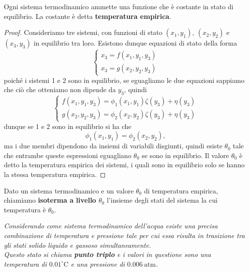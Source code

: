 \begin{proposition}\label{TemperaturaEmpirica}
Ogni sistema termodinamico ammette una funzione che \`e costante in stato di equilibrio. La costante \`e detta \textbf{temperatura empirica}.
\end{proposition}
\begin{proof}
Consideriamo tre sistemi, con funzioni di stato $(x_1, y_1),\ (x_2,y_2)$ e $(x_3,y_3)$ in equilibrio tra loro. Esistono dunque equazioni di stato della forma
\[\begin{cases}
x_3=f(x_1,y_1,y_3)\\
x_3=g(x_2,y_2,y_3)
\end{cases}\]
poich\'e i sistemi 1 e 2 sono in equilibrio, se eguagliamo le due equazioni sappiamo che ci\`o che otteniamo non dipende da $y_3$, quindi
\[\begin{cases}
f(x_1,y_1,y_3)=\phi_1(x_1,y_1)\zeta(y_3)+\eta(y_3)\\
g(x_2,y_2,y_3)=\phi_2(x_2,y_2)\zeta(y_3)+\eta(y_3)
\end{cases}\]
dunque se 1 e 2 sono in equilibrio si ha che 
\[\phi_1(x_1,y_1)=\phi_2(x_2,y_2),\]
ma i due membri dipendono da insiemi di variabili disgiunti, quindi esiste $\theta_0$ tale che entrambe queste espressioni eguagliano $\theta_0$ se sono in equilibrio. Il valore $\theta_0$ \`e detto la temperatura empirica dei sistemi, i quali sono in equilibrio solo se hanno la stessa temperatura empirica.
\end{proof}

\begin{definition}[Isoterme]
Dato un sistema termodinamico e un valore $\theta_0$ di temperatura empirica, chiamiamo \textbf{isoterma a livello $\theta_0$} l'insieme degli stati del sistema la cui temperatura \`e $\theta_0$.
\end{definition}


\begin{fact}
\emph{Considerando come sistema termodinamico dell'acqua esiste una precisa combinazione di temperatura e pressione tale per cui essa risulta in trasizione tra gli stati solido liquido e gassoso simultaneamente.\\
Questo stato si chiama \textbf{punto triplo} e i valori in questione sono una temperatura di $0.01 ^\circ \mathrm{C}$ e una pressione di $0.006\ \mathrm{atm}$.}
\end{fact}


